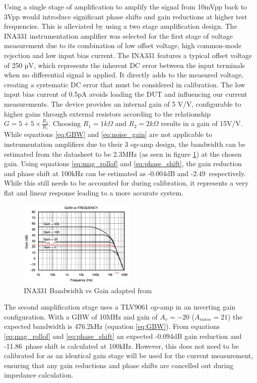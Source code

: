 Using a single stage of amplification to amplify the signal from 10mVpp back to 3Vpp would introduce significant phase shifts and gain reductions at higher test frequencies. This is alleviated by using a two stage amplification design. The INA331 instrumentation amplifier was selected for the first stage of voltage measurement due to its combination of low offset voltage, high common-mode rejection and low input bias current. The INA331 features a typical offset voltage of 250 µV, which represents the inherent DC error between the input terminals when no differential signal is applied. It directly adds to the measured voltage, creating a systematic DC error that must be considered in calibration. The low input bias current of 0.5pA avoids loading the DUT and influencing our current measurements. The device provides an internal gain of 5 V/V, configurable to higher gains through external resistors according to the relationship $G = 5 + 5\times \frac{R_2}{R_1}$. Choosing $R_1=1k\Omega$ and $R_2=2k\Omega$ results in a gain of 15V/V. While equations \ref{eq:GBW} and \ref{eq:noise_gain} are not applicable to instrumentation amplifiers due to their 3 op-amp design, the bandwidth can be estimated from the datasheet to be 2.3MHz (as seen in figure \ref{fig:ina_bw}) at the chosen gain. Using equations \ref{eq:mag_rollof} and \ref{eq:phase_shift}, the gain reduction and phase shift at 100kHz can be estimated as -0.004dB and -2.49\textdegree\ respectively. While this still needs to be accounted for during calibration, it represents a very flat and linear response leading to a more accurate system.

\begin{figure}[H]
    \centering
    \includegraphics[width=0.5\textwidth]{INA_BW.jpeg}
    \caption{INA331 Bandwidth vs Gain adapted from \cite{INA331}}
    \label{fig:ina_bw}
\end{figure}

The second amplification stage uses a TLV9061 op-amp in an inverting gain configuration. With a GBW of 10MHz and gain of $A_v=-20$ ($A_{noise}=21$) the expected bandwidth is 476.2kHz (equation \ref{eq:GBW}). From equations \ref{eq:mag_rollof} and \ref{eq:phase_shift} an expected -0.094dB gain reduction and -11.86\textdegree\ phase shift is calculated at 100kHz. However, this does not need to be calibrated for as an identical gain stage will be used for the current measurement, ensuring that any gain reductions and phase shifts are cancelled out during impedance calculation.

